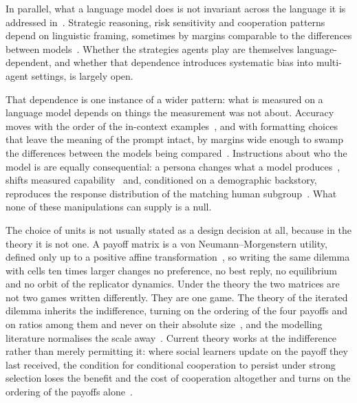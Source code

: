 \documentclass[openacc]{rsproca_new}
\begin{document}
In parallel, what a language model does is not invariant across the language
it is addressed in~\cite{buscemi2025fairgame}. Strategic reasoning, risk
sensitivity and cooperation patterns depend on linguistic framing, sometimes by
margins comparable to the differences between
models~\cite{loreheydari2024strategic,buscemi2025llms,buscemi2025strategic}.
Whether the strategies agents play are themselves language-dependent, and
whether that dependence introduces systematic bias into multi-agent settings,
is largely open.

That dependence is one instance of a wider pattern: what is measured on a
language model depends on things the measurement was not about. Accuracy moves
with the order of the in-context examples~\cite{lu2022fantastically}, and with
formatting choices that leave the meaning of the prompt intact, by margins wide
enough to swamp the differences between the models being
compared~\cite{sclar2024quantifying}. Instructions about who the model is are
equally consequential: a persona changes what a model
produces~\cite{deshpande2023toxicity}, shifts measured
capability~\cite{salewski2023context} and, conditioned on a demographic
backstory, reproduces the response distribution of the matching human
subgroup~\cite{argyle2023out}. What none of these manipulations can supply is a
null.

The choice of units is not usually stated as a design decision at all, because
in the theory it is not one. A payoff matrix is a von Neumann--Morgenstern
utility, defined only up to a positive affine
transformation~\cite{von2007theory,luce1957games}, so writing the same dilemma
with cells ten times larger changes no preference, no best reply, no
equilibrium and no orbit of the replicator dynamics. Under the theory the two
matrices are not two games written differently. They are one game. The theory
of the iterated dilemma inherits the indifference, turning on the ordering of
the four payoffs and on ratios among them and never on their absolute
size~\cite{axelrod1981evolution,nowak1992tit,nowak1993strategy,pressDyson2012},
and the modelling literature normalises the scale
away~\cite{szabo2007evolutionary,perc2010coevolutionary,wang2015universal}.
Current theory works at the indifference rather than merely permitting it:
where social learners update on the payoff they last received, the condition
for conditional cooperation to persist under strong selection loses the benefit
and the cost of cooperation altogether and turns on the ordering of the payoffs
alone~\cite{glynatsi2024evolution}.
\end{document}
